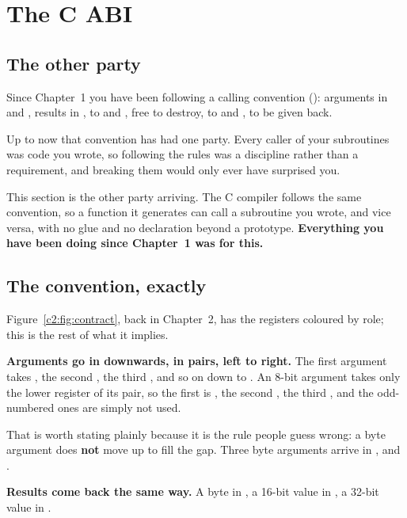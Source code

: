 
\section{The C ABI}
\label{c6:sec:abi}

\subsection{The other party}
\label{c6:sec:party}
Since Chapter~1 you have been following a calling convention (): arguments
in  and , results in ,  to  and ,
 free to destroy,  to  and ,  to be given back.

Up to now that convention has had one party. Every caller of your subroutines was code you wrote,
so following the rules was a discipline rather than a requirement, and breaking them would only
ever have surprised you.

This section is the other party arriving. The C compiler follows the same convention, so a
function it generates can call a subroutine you wrote, and vice versa, with no glue and no
declaration beyond a prototype. \textbf{Everything you have been doing since Chapter~1 was for
this.}

\subsection{The convention, exactly}
\label{c6:sec:convention}
Figure~\ref{c2:fig:contract}, back in Chapter~2, has the registers coloured by role; this is the
rest of what it implies.

\textbf{Arguments go in  downwards, in pairs, left to right.} The first argument takes
, the second , the third , and so on down to .
An 8-bit argument takes only the lower register of its pair, so the first is , the second
, the third , and the odd-numbered ones are simply not used.

That is worth stating plainly because it is the rule people guess wrong: a byte argument does
\textbf{not} move up to fill the gap. Three byte arguments arrive in ,  and
.

\textbf{Results come back the same way.} A byte in , a 16-bit value in , a
32-bit value in .

